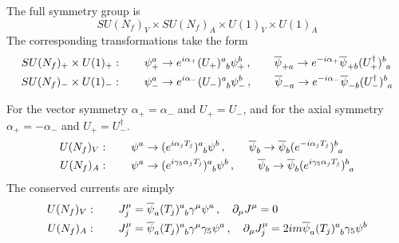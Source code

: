 The full symmetry group is
\begin{equation}
    SU(N_f)_V\times SU(N_f)_A\times U(1)_V\times U(1)_A
\end{equation}
 The corresponding transformations take the form
\begin{subequations}
    \begin{align}
        SU(N_f)_+\times U(1)_+ & :\qquad\psi_+^a\to e^{{i}\alpha_+}(U_+)^a_{\phantom{a}b}\psi_+^b\,,\qquad\overline{\psi}_{+a}\to e^{-{i}\alpha_+}\overline{\psi}_{+b}(U_+^\dagger)^b_{\phantom{b}a} \\
        SU(N_f)_-\times U(1)_- & :\qquad\psi_-^a\to e^{{i}\alpha_-}(U_-)^a_{\phantom{a}b}\psi_-^b\,,\qquad\overline{\psi}_{-a}\to e^{-{i}\alpha_-}\overline{\psi}_{-b}(U_-^\dagger)^b_{\phantom{b}a}
    \end{align}
\end{subequations}

For the vector symmetry $\alpha_+=\alpha_-$ and $U_+=U_-$, and for the axial symmetry $\alpha_+=-\alpha_-$ and $U_+=U_-^\dagger$. 
\begin{subequations}
    \begin{align}
        U(N_f)_V & :\qquad\psi^a\to (e^{{i}\alpha_jT_j})^a_{\phantom{a}b}\psi^b\,,\qquad\overline{\psi}_b\to \overline{\psi}_b(e^{-{i}\alpha_jT_j})^b_{\phantom{b}a}                \\
        U(N_f)_A & :\qquad\psi^a\to (e^{{i}\gamma_5\alpha_jT_j})^a_{\phantom{a}b}\psi^b\,,\qquad\overline{\psi}_b\to \overline{\psi}_b(e^{{i}\gamma_5\alpha_jT_j})^b_{\phantom{b}a}
    \end{align}
\end{subequations}
The conserved currents are simply
\begin{subequations}
    \begin{align}
        U(N_f)_V & :\qquad J^\mu_j=\overline{\psi}_a(T_j)^a_{\phantom{a}b}\gamma^\mu\psi^a\,,\quad\partial_\mu J^\mu=0                                                                        \\
        U(N_f)_A & :\qquad J^\mu_j=\overline{\psi}_a(T_j)^a_{\phantom{a}b}\gamma^\mu\gamma_5\psi^a\,,\quad\partial_\mu J^\mu_j=2{i} m\overline{\psi}_a(T_j)^a_{\phantom{a}b}\gamma_5\psi^b
    \end{align}
\end{subequations}

